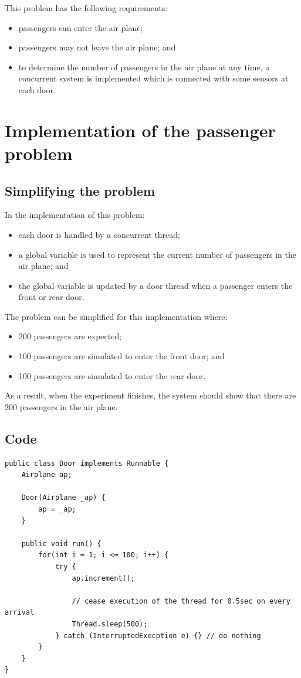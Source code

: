 \documentclass[a4paper]{systems-software}
\begin{document}
This problem has the following requirements:
\begin{itemize}
	\item passengers can enter the air plane;
	\item passengers may not leave the air plane; and
	\item to determine the number of passengers in the air plane at any time, a concurrent system is implemented which is connected with some sensors at each door.
\end{itemize}


\section*{Implementation of the passenger problem}

\subsection*{Simplifying the problem}

In the implementation of this problem:
\begin{itemize}
	\item each door is handled by a concurrent thread;
	\item a global variable is used to represent the current number of passengers in the air plane; and
	\item the global variable is updated by a door thread when a passenger enters the front or rear door.
\end{itemize}

The problem can be simplified for this implementation where:
\begin{itemize}
	\item 200 passengers are expected;
	\item 100 passengers are simulated to enter the front door; and
	\item 100 passengers are simulated to enter the rear door.
\end{itemize}

As a result, when the experiment finishes, the system should show that there are 200 passengers in the air plane.


\subsection*{Code}

\begin{lstlisting}[title={Door class.}]
public class Door implements Runnable {
	Airplane ap;
	
	Door(Airplane _ap) {
		ap = _ap;
	}
	
	public void run() {
		for(int i = 1; i <= 100; i++) {
			try {
				ap.increment();
				
				// cease execution of the thread for 0.5sec on every arrival
				Thread.sleep(500);
			} catch (InterruptedExecption e) {} // do nothing
		}
	}
}
\end{lstlisting}
\end{document}
